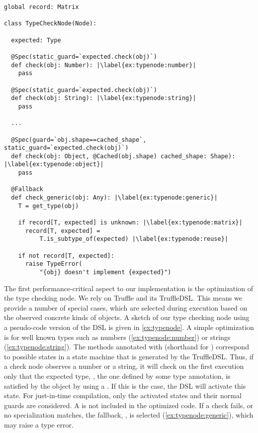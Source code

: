 \begin{lstlisting}[label={ex:typenode},escapechar=|,caption={An illustration of the type checking node that support type checking},float,floatplacement=htbp,columns=flexible,morekeywords={global}]
global record: Matrix

class TypeCheckNode(Node):

  expected: Type

  @Spec(static_guard=`expected.check(obj)`)
  def check(obj: Number): |\label{ex:typenode:number}|
    pass

  @Spec(static_guard=`expected.check(obj)`)
  def check(obj: String): |\label{ex:typenode:string}|
    pass

  ...

  @Spec(guard=`obj.shape==cached_shape`, static_guard=`expected.check(obj)`)
  def check(obj: Object, @Cached(obj.shape) cached_shape: Shape): |\label{ex:typenode:object}|
    pass
  
  @Fallback
  def check_generic(obj: Any): |\label{ex:typenode:generic}|
    T = get_type(obj)
    
    if record[T, expected] is unknown: |\label{ex:typenode:matrix}|
      record[T, expected] =
          T.is_subtype_of(expected) |\label{ex:typenode:reuse}|

    if not record[T, expected]:
      raise TypeError(
          "{obj} doesn't implement {expected}")
\end{lstlisting}

The first performance-critical aspect to our implementation
is the optimization of the type checking node.
We rely on Truffle and its TruffleDSL\citep{humer2014domainspecific}.
This means we provide a number of special cases,
which are selected during execution based on the observed concrete 
kinds of objects.
A sketch of our type checking node using a pseudo-code version of the DSL
is given in \cref{ex:typenode}.
A simple optimization is for well known types such as
numbers (\cref{ex:typenode:number}) or strings (\cref{ex:typenode:string}).
The methods annotated with  (shorthand for )
correspond to possible states in a state machine that is generated by the
TruffleDSL.
Thus, if a check node observes a number or a string,
it will check on the first execution only that the expected type,
\ie, the one defined by some type annotation,
is satisfied by the object by using a .
If this is the case, the DSL will activate this state.
For just-in-time compilation, only the activated states and their normal guards are considered.
A  is not included in the optimized code.
If a check fails, or no specialization matches, the fallback,
\ie,  is selected (\cref{ex:typenode:generic}),
which may raise a type error.

